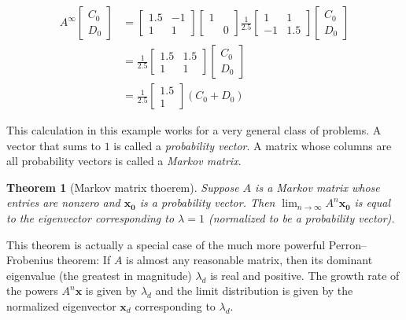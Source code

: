 \documentclass[11pt,oneside]{amsbook}
\theoremstyle{definition}
\theoremstyle{plain}
\newtheorem{theorem}{Theorem}[section]
\theoremstyle{definition}
\theoremstyle{remark}
\numberwithin{equation}{section}
\numberwithin{figure}{section}
\begin{document}
\begin{align*}
  A^\infty\begin{bmatrix}C_0\\D_0\end{bmatrix}
  &=\begin{bmatrix}1.5&-1\\1&1\end{bmatrix}
    \begin{bmatrix}1\\&0\end{bmatrix}
    \frac{1}{2.5}
    \begin{bmatrix}1&1\\-1&1.5\end{bmatrix}
    \begin{bmatrix}C_0\\D_0\end{bmatrix}\\
  &=\frac{1}{2.5}\begin{bmatrix}1.5&1.5\\1&1\end{bmatrix}
     \begin{bmatrix}C_0\\D_0\end{bmatrix}\\
  &=\frac{1}{2.5}\begin{bmatrix}1.5\\1\end{bmatrix}
   (C_0+D_0)
\end{align*}

This calculation in this example works for a very general class of problems. A vector that sums to $1$ is called a \emph{probability vector}. A matrix whose columns are all probability vectors is called a \emph{Markov matrix}.

\begin{theorem}[Markov matrix thoerem]
  Suppose $A$ is a Markov matrix whose entries are nonzero and $\bm{x_0}$ is a probability vector. Then $\lim_{n\to\infty}A^n\bm{x_0}$ is equal to the eigenvector corresponding to $\lambda=1$ (normalized to be a probability vector).
\end{theorem}

This theorem is actually a special case of the much more powerful Perron--Frobenius theorem: If $A$ is almost any reasonable matrix, then its dominant eigenvalue (the greatest in magnitude) $\lambda_d$ is real and positive. The growth rate of the powers $A^n\bm{x}$ is given by $\lambda_d$ and the limit distribution is given by the normalized eigenvector $\bm{x}_d$ corresponding to $\lambda_d$.
\end{document}
